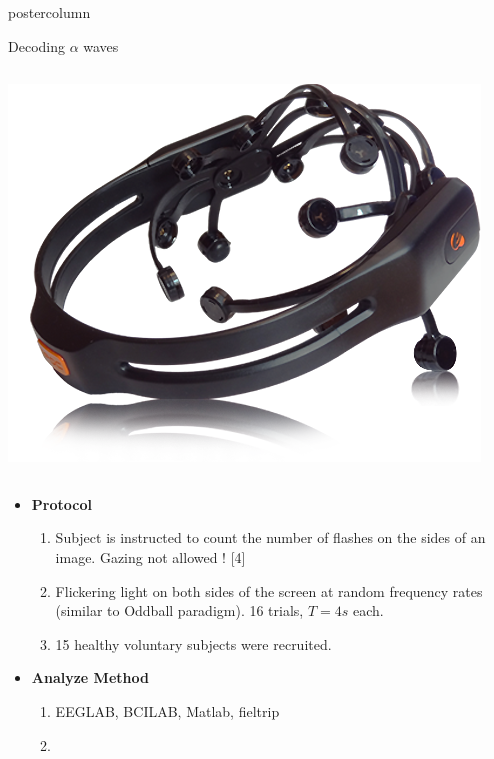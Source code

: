 \documentclass[final]{beamer}
\begin{document}
\begin{frame}
\begin{columns}
\begin{column}{.49\textwidth}
\begin{beamercolorbox}[center,wd=\textwidth]{postercolumn}
\begin{minipage}[T]{.95\textwidth}
{\begin{block}{Decoding $ \alpha$  waves}
\begin{columns}
\begin{column}{.33\textwidth}
				\centering \includegraphics[width=0.95\linewidth]{images/viola/emotivlarge}
				\end{column}
				\end{columns}
				
                \begin{itemize}
                \item \textbf{Protocol}
                \begin{enumerate}
                \item Subject is instructed to count the number of flashes on the sides of an image.  Gazing not allowed ! [4]
                \item Flickering light on both sides of the screen at random frequency rates (similar to Oddball paradigm). 16 trials, $ T =4 s $ each.
                \item 15 healthy voluntary subjects were recruited.
                \end{enumerate}
                
                \item \textbf{Analyze Method}
                \begin{enumerate}
                \item EEGLAB, BCILAB, Matlab, fieltrip
                \item 
                

\end{enumerate}
\end{itemize}
\end{block}}
\end{minipage}
\end{beamercolorbox}
\end{column}
\end{columns}
\end{frame}
\end{document}
